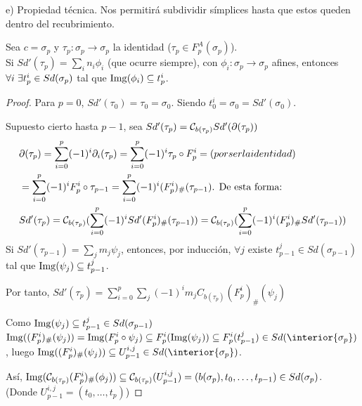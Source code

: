 e) Propiedad técnica. Nos permitirá subdividir símplices hasta que estos queden dentro del recubrimiento.

Sea $c = \sigma_p$ y $\tau_p \colon \sigma_p \to \sigma_p$ la identidad ($\tau_p \in F_p^A(\sigma_p)$). \\
Si $Sd'(\tau_p) = \sum_i n_i \phi_i$ (que ocurre siempre), con $\phi_i \colon \sigma_p \to \sigma_p$ afines, entonces
$\forall i \hspace{0.3em} \exists t_p^i \in Sd(\sigma_p)$ tal que $\operatorname{Img}(\phi_i) \subseteq t_p^i$.

\begin{proof}
  Para $p = 0$, $Sd'(\tau_0) = \tau_0 = \sigma_0$. Siendo $t_0^i = \sigma_0 = Sd'(\sigma_0)$.

  Supuesto cierto hasta $p-1$, sea $Sd'(\tau_p) = {\mathcal C}_{b(\tau_p)} Sd'(\partial(\tau_p))$
  \begin{align*}
    &\partial(\tau_p) = \sum\limits_{i = 0}^p (-1)^i \partial_i(\tau_p) = \sum\limits_{i = 0}^p (-1)^i \tau_p \circ F_p^i = (por ser la identidad) \\
    &= \sum\limits_{i = 0}^p (-1)^i F_p^i \circ \tau_{p-1} = \sum\limits_{i = 0}^p (-1)^i(F_p^i)_\# (\tau_{p-1}) \text{. De esta forma:} \\
    &Sd'(\tau_p) = {\mathcal C}_{b(\tau_p)}(\sum\limits_{i = 0}^p (-1)^i Sd'(F_p^i)_\# (\tau_{p-1})) = {\mathcal C}_{b(\tau_p)}(\sum\limits_{i = 0}^p (-1)^i(F_p^i)_\# Sd'(\tau_{p-1})) \\
  \end{align*}
  Si $Sd'(\tau_{p-1}) = \sum\limits_j m_j \psi_j$, entonces, por inducción, $\forall j$ existe $t_{p-1}^j \in Sd(\sigma_{p-1})$ tal que
  $\operatorname{Img}(\psi_j) \subseteq t_{p-1}^j$.

  Por tanto, $Sd'(\tau_p) = \sum\limits_{i = 0}^p \sum\limits_j (-1)^i m_j C_{b(\tau_p)}(F_p^i)_\# (\psi_j)$

  Como $\operatorname{Img}(\psi_j) \subseteq t_{p-1}^j \in Sd(\sigma_{p-1})$
  $\Img((F_p^i)_\# (\psi_j)) = \Img(F_p^i \circ \psi_j) \subseteq F_p^i(\Img(\psi_j)) \subseteq F_p^i(t_{p-1}^j) \in Sd(\interior{\sigma_p})$,
  luego $\Img((F_p^i)_\# (\psi_j)) \subseteq U_{p-1}^{i,j} \in Sd(\interior{\sigma_p})$.

  Así, $\operatorname{Img}({\mathcal C}_{b(\tau_p)}(F_p^i)_\# (\phi_j)) \subseteq {\mathcal C}_{b(\tau_p)}(U_{p-1}^{i, j}) = (b(\sigma_p), t_0, \dots, t_{p-1}) \in Sd(\sigma_p)$.\\
  (Donde $U_{p-1}^{i,j} = (t_0, \dots, t_p)$)
\end{proof}
